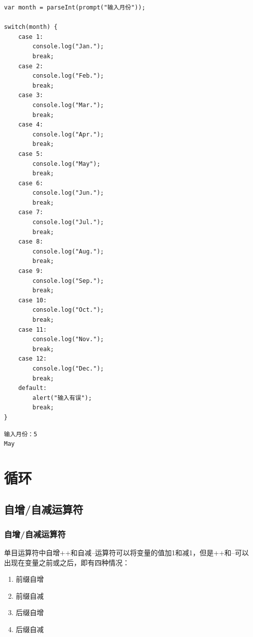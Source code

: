 \begin{lstlisting}[style=htmlcssjs]
var month = parseInt(prompt("输入月份"));

switch(month) {
    case 1:
        console.log("Jan.");
        break;
    case 2:
        console.log("Feb.");
        break;
    case 3:
        console.log("Mar.");
        break;
    case 4:
        console.log("Apr.");
        break;
    case 5:
        console.log("May");
        break;
    case 6:
        console.log("Jun.");
        break;
    case 7:
        console.log("Jul.");
        break;
    case 8:
        console.log("Aug.");
        break;
    case 9:
        console.log("Sep.");
        break;
    case 10:
        console.log("Oct.");
        break;
    case 11:
        console.log("Nov.");
        break;
    case 12:
        console.log("Dec.");
        break;
    default:
        alert("输入有误");
        break;
}
\end{lstlisting}

\begin{tcolorbox}
	\begin{verbatim}
输入月份：5
May
	\end{verbatim}
\end{tcolorbox}

\newpage

\chapter{循环}

\section{自增/自减运算符}

\subsection{自增/自减运算符}

单目运算符中自增++和自减--运算符可以将变量的值加1和减1，但是++和--可以出现在变量之前或之后，即有四种情况：

\begin{enumerate}
	\item 前缀自增
	\item 前缀自减
	\item 后缀自增
	\item 后缀自减
\end{enumerate}

\begin{table}[H]
	\centering
	\caption{自增/自减运算符}
\end{table}

